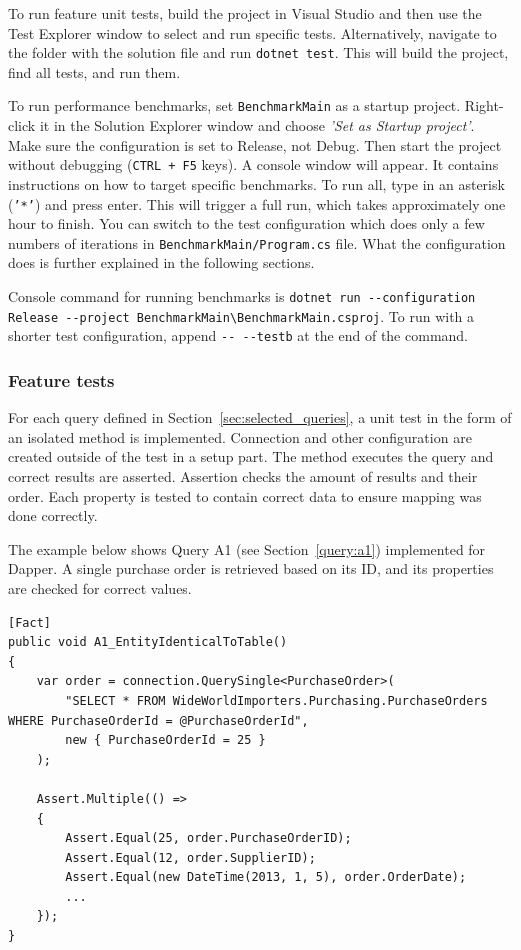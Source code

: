 To run feature unit tests, build the project in Visual Studio and then use the Test Explorer window to select and run specific tests. Alternatively, navigate to the folder with the solution file and run \lstinline{dotnet test}. This will build the project, find all tests, and run them. 

To run performance benchmarks, set \texttt{BenchmarkMain} as a startup project. Right-click it in the Solution Explorer window and choose \textit{'Set as Startup project'}. Make sure the configuration is set to Release, not Debug. Then start the project without debugging (\texttt{CTRL + F5} keys). A console window will appear. It contains instructions on how to target specific benchmarks. To run all, type in an asterisk (\texttt{'*'}) and press enter. This will trigger a full run, which takes approximately one hour to finish. You can switch to the test configuration which does only a few numbers of iterations in \texttt{BenchmarkMain/Program.cs} file. What the configuration does is further explained in the following sections. 

Console command for running benchmarks is \lstinline{dotnet run --configuration Release --project BenchmarkMain\BenchmarkMain.csproj}. To run with a shorter test configuration, append \lstinline{-- --testb} at the end of the command.

\subsubsection{Feature tests}
For each query defined in Section~\ref{sec:selected_queries}, a unit test in the form of an isolated method is implemented. Connection and other configuration are created outside of the test in a setup part. The method executes the query and correct results are asserted. Assertion checks the amount of results and their order. Each property is tested to contain correct data to ensure mapping was done correctly.

The example below shows Query A1 (see Section~\ref{query:a1}) implemented for Dapper. A single purchase order is retrieved based on its ID, and its properties are checked for correct values. 
\begin{lstlisting}[language=CSharp]
[Fact]
public void A1_EntityIdenticalToTable()
{
    var order = connection.QuerySingle<PurchaseOrder>(
        "SELECT * FROM WideWorldImporters.Purchasing.PurchaseOrders WHERE PurchaseOrderId = @PurchaseOrderId",
        new { PurchaseOrderId = 25 }
    );

    Assert.Multiple(() =>
    {
        Assert.Equal(25, order.PurchaseOrderID);
        Assert.Equal(12, order.SupplierID);
        Assert.Equal(new DateTime(2013, 1, 5), order.OrderDate);
        ...
    });
}
\end{lstlisting}

